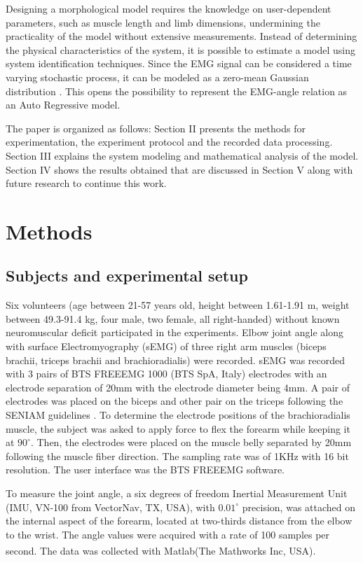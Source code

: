 \documentclass[letterpaper, 10 pt, conference]{ieeeconf}  %
\begin{document}
Designing a morphological model requires the knowledge on user-dependent parameters, such as muscle length and limb dimensions, undermining the practicality of the model without extensive measurements. Instead of determining the physical characteristics of the system, it is possible to estimate a model using system identification techniques. Since the EMG signal can be considered a time varying stochastic process, it can be modeled as a zero-mean Gaussian distribution \cite{Hogan4123280,Hogan4123279}. This opens the possibility to represent the EMG-angle relation as an Auto Regressive model.

The paper is organized as follows: Section II presents the methods for experimentation, the experiment protocol and the recorded data processing. Section III explains the system modeling and mathematical analysis of the model. Section IV shows the results obtained that are discussed in Section V along with future research to continue this work.

\section{Methods}
\subsection{Subjects and experimental setup}
Six volunteers (age between 21-57 years old, height between 1.61-1.91 m, weight between 49.3-91.4 kg, four male, two female, all right-handed) without known neuromuscular deficit participated in the experiments. Elbow joint angle along with surface Electromyography (sEMG) of three right arm muscles (biceps brachii,  triceps brachii and brachioradialis) were recorded. 
sEMG was recorded with 3 pairs of BTS FREEEMG 1000 (BTS SpA, Italy) electrodes with an electrode separation of 20mm with the electrode diameter being 4mm. A pair of electrodes was placed on the biceps and other pair on the triceps following the SENIAM guidelines \cite{SENIAM20170110}. To determine the electrode positions of the brachioradialis muscle, the subject was asked to apply force to flex the forearm while keeping it at \(90^{\circ}\). Then, the electrodes were placed on the muscle belly separated by 20mm following the muscle fiber direction. The sampling rate was of 1KHz with 16 bit resolution. The user interface was the BTS FREEEMG software. 

  To measure the joint angle, a six degrees of freedom Inertial Measurement Unit (IMU, VN-100 from VectorNav, TX, USA), with \(0.01^{\circ}\) precision, was attached on the internal aspect of the forearm, located at two-thirds distance from the elbow to the wrist. The angle values were acquired with a rate of 100 samples per second. The data was collected with Matlab\textsuperscript{\textregistered}(The Mathworks Inc, USA).
\end{document}
